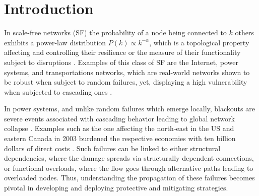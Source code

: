 \section{Introduction}
\label{introduction}

In scale-free networks (SF) the probability of a node being connected to $k$ others exhibits a power-law distribution $P(k) \propto k^{-\alpha}$, which is a topological property affecting and controlling their resilience or the measure of their functionality subject to disruptions \cite{Newman:2003da,Gao:2015fg,Bashan:2013cja,2000Natur.406..378A}. Examples of this class of SF are the Internet, power systems, and transportations networks, which are real-world networks shown to be robust when subject to random failures, yet, displaying a high vulnerability when subjected to cascading ones \cite{Bompard:2011cd,DuenasOsorio:2009ff,2016arXiv160904310M,Cohen:2001hf}. 

In power systems, and unlike random failures which emerge locally, blackouts are severe events  associated with cascading behavior leading to global network collapse \cite{RosasCasals:2007td,Bompard:2009ga,Brummitt:2013jj,Daqing:2014bp,Albert:2004bw,Wang:2011js,Sole:2008cv}. Examples such as the one affecting the north-east in the US and eastern Canada in 2003 burdened the respective economies with ten billion dollars of direct costs \cite{Daqing:2014bp}. Such failures can be linked to either structural dependencies, where the damage spreads via structurally dependent connections, or functional overloads, where the flow goes through alternative paths leading to overloaded nodes. Thus, understanding the propagation of these failures becomes pivotal in developing and deploying protective and mitigating strategies. 

